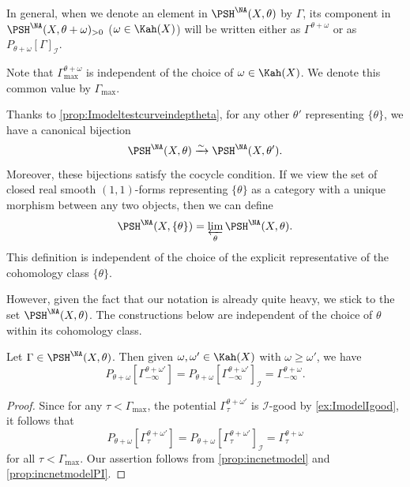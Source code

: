 In general, when we denote an element in $\PSH^{\NA}(X,\theta)$ by $\Gamma$, its component in $\PSH^{\NA}(X,\theta+\omega)_{>0}$ ($\omega\in \Kah(X)$) will be written either as $\Gamma^{\theta+\omega}$ or as $P_{\theta+\omega}[\Gamma]_{\mathcal{I}}$.

Note that $\Gamma^{\theta+\omega}_{\max}$ is independent of the choice of $\omega\in \Kah(X)$. We denote this common value by $\Gamma_{\max}$\index{$\Gamma_{\max}$}.
\begin{remark}\label{rmk:NApotential:L47}
    Thanks to \cref{prop:Imodeltestcurveindeptheta}, for any other $\theta'$ representing $\{\theta\}$, we have a canonical bijection
    \[
    \PSH^{\NA}(X,\theta)\xrightarrow{\sim}\PSH^{\NA}(X,\theta').
    \]
    Moreover, these bijections satisfy the cocycle condition. If we view the set of closed real smooth $(1,1)$-forms representing $\{\theta\}$ as a category with a unique morphism between any two objects, then we can define
    \[
    \PSH^{\NA}(X,\{\theta\})=\varprojlim_{\theta} \PSH^{\NA}(X,\theta).
    \]
    This definition is independent of the choice of the explicit representative of the cohomology class $\{\theta\}$.

    However, given the fact that our notation is already quite heavy, we stick to the set $\PSH^{\NA}(X,\theta)$. The constructions below are independent of the choice of $\theta$ within its cohomology class.
\end{remark}

\begin{proposition}\label{prop:testcminftyPrela}
    Let $\Gamma\in \PSH^{\NA}(X,\theta)$. Then given $\omega,\omega'\in \Kah(X)$ with $\omega\geq \omega'$, we have
    \[
        P_{\theta+\omega}\left[ \Gamma^{\theta+\omega'}_{-\infty} \right]=P_{\theta+\omega}\left[ \Gamma^{\theta+\omega'}_{-\infty} \right]_{\mathcal{I}} = \Gamma^{\theta+\omega}_{-\infty}.
    \]
\end{proposition}
\begin{proof}
Since for any $\tau<\Gamma_{\max}$, the potential $\Gamma^{\theta+\omega'}_{\tau}$ is $\mathcal{I}$-good by \cref{ex:ImodelIgood}, it follows that
\[
P_{\theta+\omega}\left[ \Gamma^{\theta+\omega'}_{\tau} \right]=P_{\theta+\omega}\left[ \Gamma^{\theta+\omega'}_{\tau} \right]_{\mathcal{I}}=\Gamma^{\theta+\omega}_{\tau}
\]
for all $\tau<\Gamma_{\max}$.
Our assertion follows from \cref{prop:incnetmodel} and \cref{prop:incnetmodelPI}.
\end{proof}


